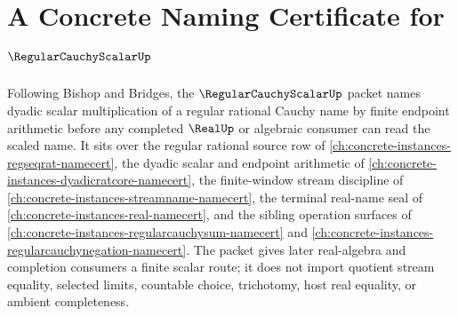 \chapter{A Concrete Naming Certificate for $\RegularCauchyScalarUp$}
\label{ch:concrete-instances-regularcauchyscalar-namecert}

Following Bishop and Bridges, the $\RegularCauchyScalarUp$ packet names dyadic scalar multiplication of a regular rational Cauchy name by finite endpoint arithmetic before any completed $\RealUp$ or algebraic consumer can read the scaled name. It sits over the regular rational source row of \autoref{ch:concrete-instances-regseqrat-namecert}, the dyadic scalar and endpoint arithmetic of \autoref{ch:concrete-instances-dyadicratcore-namecert}, the finite-window stream discipline of \autoref{ch:concrete-instances-streamname-namecert}, the terminal real-name seal of \autoref{ch:concrete-instances-real-namecert}, and the sibling operation surfaces of \autoref{ch:concrete-instances-regularcauchysum-namecert} and \autoref{ch:concrete-instances-regularcauchynegation-namecert}. The packet gives later real-algebra and completion consumers a finite scalar route; it does not import quotient stream equality, selected limits, countable choice, trichotomy, host real equality, or ambient completeness.

